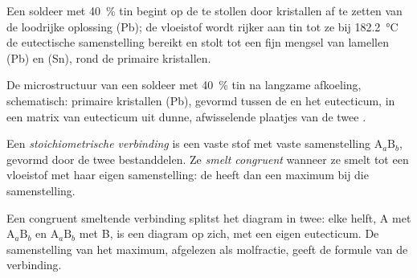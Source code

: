 Een soldeer met 40~\% tin begint op de  te stollen door kristallen af te zetten van
de loodrijke oplossing (Pb); de vloeistof wordt rijker aan tin tot ze bij
\qty{182.2}{\degreeCelsius} de eutectische samenstelling bereikt en stolt tot
een fijn mengsel van lamellen (Pb) en (Sn), rond de primaire kristallen.

\begin{omfigure}

{\small De microstructuur van een soldeer met 40~\% tin na langzame afkoeling, schematisch:
primaire kristallen (Pb), gevormd tussen de  en het eutecticum, in een
matrix van eutecticum uit dunne, afwisselende plaatjes van de twee .}
\end{omfigure}

\begin{definition}\label{def:b2:solid-liquid-diagrams:defined-compound}
Een \emph{stoichiometrische verbinding} is een vaste stof met vaste
samenstelling $\mathrm{A}_a\mathrm{B}_b$, gevormd door de twee bestanddelen. Ze
\emph{smelt congruent} wanneer ze smelt tot een vloeistof met
haar eigen samenstelling: de  heeft dan een maximum bij die samenstelling.
\end{definition}

Een congruent smeltende verbinding splitst het diagram in twee: elke helft, A met
$\mathrm{A}_a\mathrm{B}_b$ en $\mathrm{A}_a\mathrm{B}_b$ met B, is een diagram op
zich, met een eigen eutecticum. De samenstelling van het maximum, afgelezen als
molfractie, geeft de formule van de verbinding.

